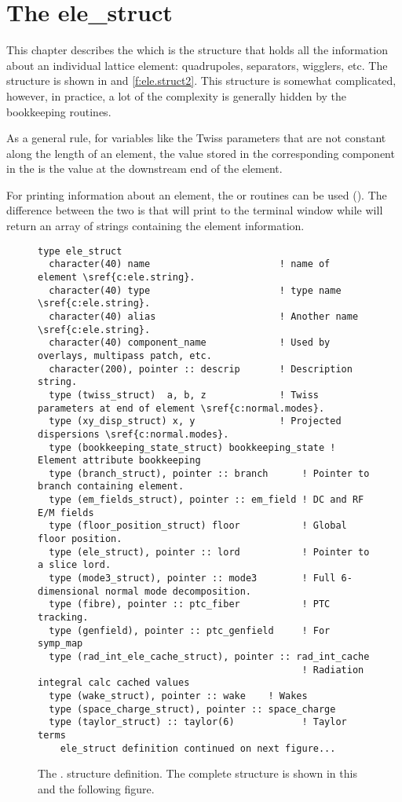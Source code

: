 \chapter{The ele_struct}
\label{c:ele.struct}

This chapter describes the  which is the structure that
holds all the information about an individual lattice element:
quadrupoles, separators, wigglers, etc. The  structure is
shown in   and \ref{f:ele.struct2}. This
structure is somewhat complicated, however, in practice, a lot of the
complexity is generally hidden  by the \bmad bookkeeping routines.

As a general rule, for variables like the Twiss parameters that are not
constant along the length of an element, the value stored in the
corresponding component in the  is the value at the downstream
end of the element.

For printing information about an element, the
 or  routines
can be used (). The difference between the two is
that  will print to the terminal window while 
will return an array of strings containing the element information.
\nopagebreak[4]
\begin{figure}[htb]
\centering
\footnotesize
\begin{verbatim}
type ele_struct
  character(40) name                       ! name of element \sref{c:ele.string}.
  character(40) type                       ! type name \sref{c:ele.string}.
  character(40) alias                      ! Another name \sref{c:ele.string}.
  character(40) component_name             ! Used by overlays, multipass patch, etc.
  character(200), pointer :: descrip       ! Description string.
  type (twiss_struct)  a, b, z             ! Twiss parameters at end of element \sref{c:normal.modes}.
  type (xy_disp_struct) x, y               ! Projected dispersions \sref{c:normal.modes}.
  type (bookkeeping_state_struct) bookkeeping_state ! Element attribute bookkeeping
  type (branch_struct), pointer :: branch      ! Pointer to branch containing element.
  type (em_fields_struct), pointer :: em_field ! DC and RF E/M fields
  type (floor_position_struct) floor           ! Global floor position.
  type (ele_struct), pointer :: lord           ! Pointer to a slice lord.
  type (mode3_struct), pointer :: mode3        ! Full 6-dimensional normal mode decomposition.
  type (fibre), pointer :: ptc_fiber           ! PTC tracking.
  type (genfield), pointer :: ptc_genfield     ! For symp_map
  type (rad_int_ele_cache_struct), pointer :: rad_int_cache  
                                               ! Radiation integral calc cached values 
  type (wake_struct), pointer :: wake    ! Wakes
  type (space_charge_struct), pointer :: space_charge 
  type (taylor_struct) :: taylor(6)            ! Taylor terms
    ele_struct definition continued on next figure...
\end{verbatim}
\caption[The  (part 1).]{The . structure definition. 
The complete structure is shown in this and the following figure.}
\label{f:ele.struct1}
\end{figure}


